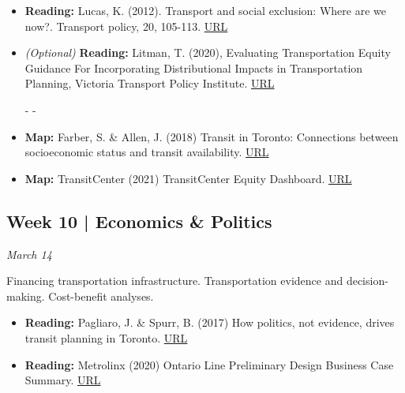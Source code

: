 \documentclass[11pt]{article}
\begin{document}
	\begin{itemize}
		\item \textbf{Reading:} Lucas, K. (2012). Transport and social exclusion: Where are we now?. Transport policy, 20, 105-113. \href{https://doi.org/10.1016/j.tranpol.2012.01.013}{URL}
		
		\item \textit{(Optional)} \textbf{Reading:} Litman, T. (2020), Evaluating Transportation Equity Guidance For Incorporating Distributional Impacts in Transportation Planning, Victoria Transport Policy Institute. \href{https://vtpi.org/equity.pdf}{URL}
		
		- - 
		
		\item \textbf{Map:} Farber, S. \& Allen, J. (2018) Transit in Toronto: Connections between socioeconomic status and transit availability.  \href{http://edu.maps.arcgis.com/apps/Cascade/index.html?appid=58618c037f344aaaada20b0c894e011c}{URL}
		
		\item \textbf{Map:} TransitCenter (2021) TransitCenter Equity Dashboard. \href{https://dashboard.transitcenter.org/}{URL}
		
		
	\end{itemize}
	
	
	
	
	
	\subsection*{Week 10 | Economics \& Politics}
	
	\textit{March 14}
	
	Financing transportation infrastructure. Transportation evidence and decision-making. Cost-benefit analyses. 
	
	\begin{itemize}
		
		\item \textbf{Reading:} Pagliaro, J. \& Spurr, B. (2017) How politics, not evidence, drives transit planning in Toronto. \href{https://www.thestar.com/news/city_hall/2017/09/18/how-politics-not-evidence-drives-transit-planning-in-toronto.html}{URL}
		
		\item \textbf{Reading:} Metrolinx (2020) Ontario Line Preliminary Design 
		Business Case Summary.
		\href{https://www.metrolinx.com/en/regionalplanning/projectevaluation/benefitscases/benefits_case_analyses.aspx}{URL}
		
		
	\end{itemize}
	
\end{document}
